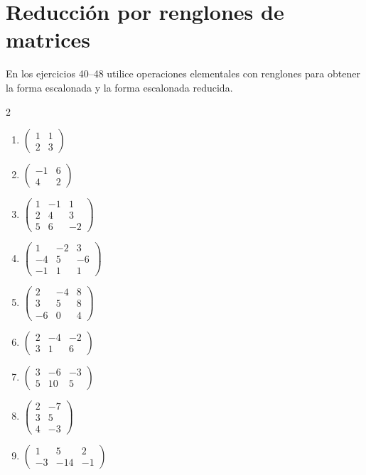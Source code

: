 \documentclass[12pt]{article}
\theoremstyle{remark}
\begin{document}
\section{Reducción por renglones de matrices}

En los ejercicios 40--48 utilice operaciones elementales con renglones para obtener
la forma escalonada y la forma escalonada reducida.

\begin{multicols}{2}
\begin{enumerate}[label=\textbf{\arabic*.},start=40,leftmargin=*]
\item $\begin{pmatrix}1&1\\2&3\end{pmatrix}$
\item $\begin{pmatrix}-1&6\\4&2\end{pmatrix}$
\item $\begin{pmatrix}1&-1&1\\2&4&3\\5&6&-2\end{pmatrix}$
\item $\begin{pmatrix}1&-2&3\\-4&5&-6\\-1&1&1\end{pmatrix}$
\item $\begin{pmatrix}2&-4&8\\3&5&8\\-6&0&4\end{pmatrix}$
\item $\begin{pmatrix}2&-4&-2\\3&1&6\end{pmatrix}$
\item $\begin{pmatrix}3&-6&-3\\5&10&5\end{pmatrix}$
\item $\begin{pmatrix}2&-7\\3&5\\4&-3\end{pmatrix}$
\item $\begin{pmatrix}1&5&2\\-3&-14&-1\end{pmatrix}$
\end{enumerate}
\end{multicols}
\end{document}
